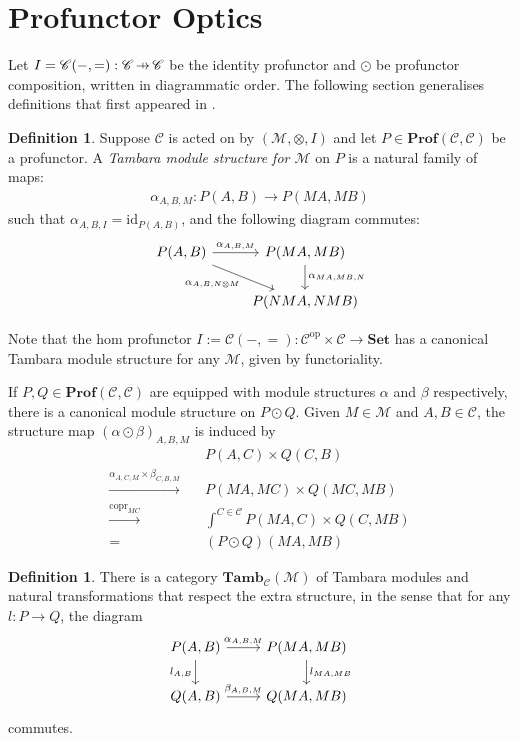 \documentclass[11pt,a4paper]{article}
\theoremstyle{plain}
\theoremstyle{definition}
\newtheorem{definition}[theorem]{Definition}
\newcommand{\C}{\mathscr{C}}
\newcommand{\M}{\mathscr{M}}
\newcommand{\Set}{\mathbf{Set}}
\newcommand{\Prof}{\mathbf{Prof}}
\newcommand{\Tamb}{\mathbf{Tamb}}
\newcommand{\id}{\mathrm{id}}
\newcommand{\op}{\mathrm{op}}
\DeclareMathOperator{\copr}{copr}
\newcommand{\hto}{\ensuremath{\,\mathaccent\shortmid\rightarrow\,}}
\begin{document}
\section{Profunctor Optics}
Let $I = \C(-,{=}) : \C \hto \C$ be the identity profunctor and $\odot$ be profunctor composition, written in diagrammatic order. The following section generalises definitions that first appeared in \cite{Doubles}.
\begin{definition}
Suppose $\C$ is acted on by $(\M, \otimes, I)$ and let $P \in \Prof(\C, \C)$ be a profunctor. A \emph{Tambara module structure for $\M$} on $P$ is a natural family of maps:
\begin{align*}
\alpha_{A,B,M} : P(A,B) \to P(MA, MB)
\end{align*}
such that $\alpha_{A,B,I} = \id_{P(A,B)}$, and the following diagram commutes:
\[
\begin{tikzcd}
P(A,B) \ar[r, "\alpha_{A,B,M}"] \ar[dr, "\alpha_{A, B, N \otimes M}" below left] & P(MA, MB) \ar[d, "\alpha_{MA, MB, N}" right] \\
& P(NMA, NMB)
\end{tikzcd}
\]
\end{definition}

Note that the hom profunctor $I := \C(-, =) : \C^\op \times \C \to \Set$ has a canonical Tambara module structure for any $\M$, given by functoriality.

If $P, Q \in \Prof(\C, \C)$ are equipped with module structures $\alpha$ and $\beta$ respectively, there is a canonical module structure on $P \odot Q$. Given $M \in \M$ and $A,B \in \C$, the structure map $(\alpha \odot \beta)_{A,B,M}$ is induced by
\begin{align*}
&P(A,C) \times Q(C,B)  \\
\xrightarrow{\alpha_{A,C,M} \times \beta_{C,B,M}} \quad& P(MA, MC) \times Q(MC, MB) \\
\xrightarrow{\copr_{MC}} \quad&\int^{C \in \C} P(MA, C) \times Q(C, MB) \\
= \quad&(P \odot Q)(MA, MB)
\end{align*}

\begin{definition}
There is a category $\Tamb_\C(\M)$ of Tambara modules and natural transformations that respect the extra structure, in the sense that for any $l : P \to Q$, the diagram
\[
\begin{tikzcd}
P(A,B) \ar[r, "\alpha_{A,B,M}"] \ar[d, "l_{A,B}" left] & P(MA, MB) \ar[d, "l_{MA, MB}" right] \\
Q(A,B) \ar[r, "\beta_{A,B,M}"] & Q(MA, MB)
\end{tikzcd}
\]
commutes.
\end{definition}
\end{document}
